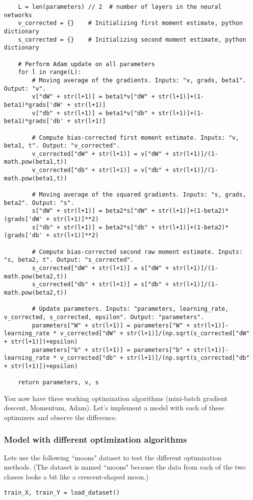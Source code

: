 {\begin{verbatim}
    L = len(parameters) // 2  # number of layers in the neural networks
    v_corrected = {}    # Initializing first moment estimate, python dictionary
    s_corrected = {}    # Initializing second moment estimate, python dictionary
    
    # Perform Adam update on all parameters
    for l in range(L):
        # Moving average of the gradients. Inputs: "v, grads, beta1". Output: "v".
        v["dW" + str(l+1)] = beta1*v["dW" + str(l+1)]+(1-beta1)*grads['dW' + str(l+1)]
        v["db" + str(l+1)] = beta1*v["db" + str(l+1)]+(1-beta1)*grads['db' + str(l+1)]

        # Compute bias-corrected first moment estimate. Inputs: "v, beta1, t". Output: "v_corrected".
        v_corrected["dW" + str(l+1)] = v["dW" + str(l+1)]/(1-math.pow(beta1,t))
        v_corrected["db" + str(l+1)] = v["db" + str(l+1)]/(1-math.pow(beta1,t))

        # Moving average of the squared gradients. Inputs: "s, grads, beta2". Output: "s".
        s["dW" + str(l+1)] = beta2*s["dW" + str(l+1)]+(1-beta2)*(grads['dW' + str(l+1)]**2)
        s["db" + str(l+1)] = beta2*s["db" + str(l+1)]+(1-beta2)*(grads['db' + str(l+1)]**2)

        # Compute bias-corrected second raw moment estimate. Inputs: "s, beta2, t". Output: "s_corrected".
        s_corrected["dW" + str(l+1)] = s["dW" + str(l+1)]/(1-math.pow(beta2,t))
        s_corrected["db" + str(l+1)] = s["db" + str(l+1)]/(1-math.pow(beta2,t))

        # Update parameters. Inputs: "parameters, learning_rate, v_corrected, s_corrected, epsilon". Output: "parameters".
        parameters["W" + str(l+1)] = parameters["W" + str(l+1)]-learning_rate * v_corrected["dW" + str(l+1)]/(np.sqrt(s_corrected["dW" + str(l+1)])+epsilon)
        parameters["b" + str(l+1)] = parameters["b" + str(l+1)]-learning_rate * v_corrected["db" + str(l+1)]/(np.sqrt(s_corrected["db" + str(l+1)])+epsilon)

    return parameters, v, s
\end{verbatim}

You now have three working optimization algorithms (mini-batch gradient descent, Momentum, Adam). Let's implement a model with each of these optimizers and observe the difference.



\subsubsection{Model with different optimization algorithms}
Lets use the following ``moons" dataset to test the different optimization methods. (The dataset is named ``moons" because the data from each of the two classes looks a bit like a crescent-shaped moon.)
\begin{verbatim}
train_X, train_Y = load_dataset()
\end{verbatim}

}
